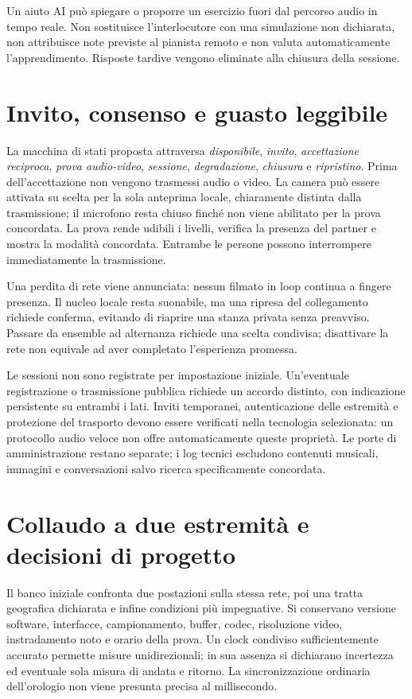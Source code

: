 Un aiuto AI può spiegare o proporre un esercizio fuori dal percorso
audio in tempo reale. Non sostituisce l'interlocutore con una
simulazione non dichiarata, non attribuisce note previste al
pianista remoto e non valuta automaticamente l'apprendimento.
Risposte tardive vengono eliminate alla chiusura della sessione.

\section{Invito, consenso e guasto leggibile}

La macchina di stati proposta attraversa \emph{disponibile},
\emph{invito}, \emph{accettazione reciproca}, \emph{prova audio-video},
\emph{sessione}, \emph{degradazione}, \emph{chiusura} e \emph{ripristino}.
Prima dell'accettazione non vengono trasmessi audio o video.
La camera può essere attivata su scelta per la sola anteprima locale,
chiaramente distinta dalla trasmissione; il microfono resta chiuso
finché non viene abilitato per la prova concordata. La prova rende udibili i livelli, verifica la
presenza del partner e mostra la modalità concordata. Entrambe
le persone possono interrompere immediatamente la trasmissione.

Una perdita di rete viene annunciata: nessun filmato in loop
continua a fingere presenza. Il nucleo locale resta suonabile,
ma una ripresa del collegamento richiede conferma, evitando di
riaprire una stanza privata senza preavviso. Passare da ensemble
ad alternanza richiede una scelta condivisa; disattivare la rete
non equivale ad aver completato l'esperienza promessa.

Le sessioni non sono registrate per impostazione iniziale. Un'eventuale
registrazione o trasmissione pubblica richiede un accordo distinto,
con indicazione persistente su entrambi i lati. Inviti temporanei,
autenticazione delle estremità e protezione del trasporto devono
essere verificati nella tecnologia selezionata: un protocollo audio
veloce non offre automaticamente queste proprietà. Le porte di
amministrazione restano separate; i log tecnici escludono contenuti
musicali, immagini e conversazioni salvo ricerca specificamente
concordata.

\section{Collaudo a due estremità e decisioni di progetto}

Il banco iniziale confronta due postazioni sulla stessa rete,
poi una tratta geografica dichiarata e infine condizioni più
impegnative. Si conservano versione software, interfacce, campionamento,
buffer, codec, risoluzione video, instradamento noto e orario della
prova. Un clock condiviso sufficientemente accurato permette
misure unidirezionali; in sua assenza si dichiarano incertezza
ed eventuale sola misura di andata e ritorno. La sincronizzazione
ordinaria dell'orologio non viene presunta precisa al millisecondo.

